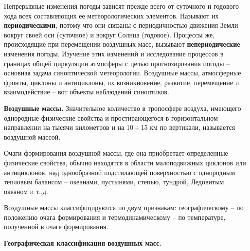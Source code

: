 \documentclass[a4paper, 12pt, twoside, final, book, russian, fittopage, cyremdash]{ncc}
\newcommand{\otdo}{\,\ensuremath{\div}\,}
\begin{document}
Непрерывные изменения погоды зависят прежде всего от суточного и годового хода всех составляющих ее метеорологических элементов. Называют их \textbf{периодическими}, потому что они связаны с периодичностью движения Земли вокруг своей оси (суточное) и вокруг Солнца (годовое). Процессы же, происходящие при перемещении воздушных масс, вызывают \textbf{непериодические} изменения погоды. Изучение этих изменений и исследование процессов в границах общей циркуляции атмосферы с целью прогнозирования погоды \--- основная задача синоптической метеорологии. Воздушные массы, атмосферные фронты, циклоны и антициклоны, их возникновение, развитие, перемещение и взаимодействие \--- вот объекты наблюдений синоптиков.

\textbf{Воздушные массы.} Значительное количество в тропосфере воздуха, имеющего однородные физические свойства и простирающегося в горизонтальном направлении на тысячи километров и на 10\otdo 15 км по вертикали, называется воздушной массой.

Очаги формирования воздушной массы, где она приобретает определенные физические свойства, обычно находятся в области малоподвижных циклонов или антициклонов, над однообразной подстилающей поверхностью с однородным тепловым балансом \--- океанами, пустынями, степью, тундрой, Ледовитым океаном и т.\=,д.

Воздушные массы классифицируются по двум признакам: географическому \--- по положению очага формирования и термодинамическому \--- по температуре, полученной в очаге формирования.

\textbf{Географическая классификация воздушных масс.}
\end{document}
